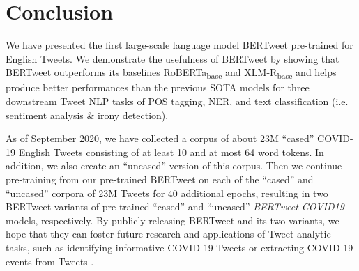 \documentclass[11pt,a4paper]{article}
\begin{document}
 
\section{Conclusion}
We have presented the first large-scale language model BERTweet pre-trained for English Tweets. We demonstrate the usefulness of BERTweet by showing that  BERTweet outperforms its baselines RoBERTa\textsubscript{base} and XLM-R\textsubscript{base} and helps produce better performances than the previous SOTA models for three downstream Tweet NLP tasks of POS tagging,  NER, and text classification (i.e. sentiment analysis \& irony detection). 

As of September 2020, we have collected a  corpus of about 23M ``cased'' COVID-19 English Tweets  consisting of at least 10 and  at  most  64  word tokens. In addition, we also create an ``uncased'' version of this corpus. Then we continue pre-training from our pre-trained BERTweet on each of the ``cased'' and ``uncased'' corpora of 23M Tweets for  40 additional epochs, resulting in two BERTweet variants of pre-trained ``cased'' and ``uncased'' \emph{BERTweet-COVID19} models, respectively. 
By publicly releasing BERTweet and its two variants,  we hope that they can foster future research and applications of Tweet analytic tasks, such as identifying informative COVID-19 Tweets \cite{covid19tweet} or extracting COVID-19 events from Tweets \cite{zong2020extracting}.
 
{

}
\end{document}
